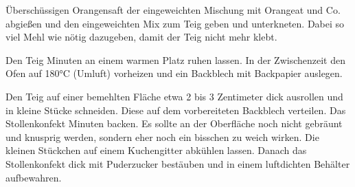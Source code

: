 \begin{recipeDP}
{        \step Überschüssigen Orangensaft der eingeweichten Mischung mit Orangeat und Co. abgießen und den eingeweichten Mix zum Teig geben und unterkneten.
        Dabei so viel Mehl wie nötig dazugeben, damit der Teig nicht mehr klebt.

        \step Den Teig  Minuten an einem warmen Platz ruhen lassen.
        In der Zwischenzeit den Ofen auf 180°C (Umluft) vorheizen und ein Backblech mit Backpapier auslegen.

        \step Den Teig auf einer bemehlten Fläche etwa 2 bis 3 Zentimeter dick ausrollen und in kleine Stücke schneiden. Diese auf dem vorbereiteten Backblech verteilen.
        Das Stollenkonfekt  Minuten backen.
        Es sollte an der Oberfläche noch nicht gebräunt und knusprig werden, sondern eher noch ein bisschen zu weich wirken.
        Die kleinen Stückchen auf einem Kuchengitter abkühlen lassen.
        Danach das Stollenkonfekt dick mit Puderzucker bestäuben und in einem luftdichten Behälter aufbewahren.
    }



\end{recipeDP}